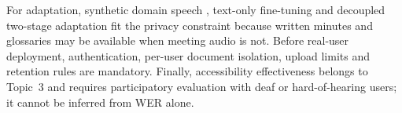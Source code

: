 \documentclass[12pt]{report}
\begin{document}
For adaptation, synthetic domain speech \cite{tran2025das}, text-only fine-tuning \cite{fang2025textonly} and decoupled two-stage adaptation \cite{zheng2026twostage} fit the privacy constraint because written minutes and glossaries may be available when meeting audio is not. Before real-user deployment, authentication, per-user document isolation, upload limits and retention rules are mandatory. Finally, accessibility effectiveness belongs to Topic~3 and requires participatory evaluation with deaf or hard-of-hearing users; it cannot be inferred from WER alone.


\renewcommand{\cftchappresnum}{\chaptername~}
\renewcommand{\cftchapnumwidth}{6em}
\cleardoublepage
\printbibliography[heading=subbibliography,
                    title={Bibliography}]
\thispagestyle{fancy}
\newpage
\tableofcontents
\thispagestyle{fancy}
\end{document}
